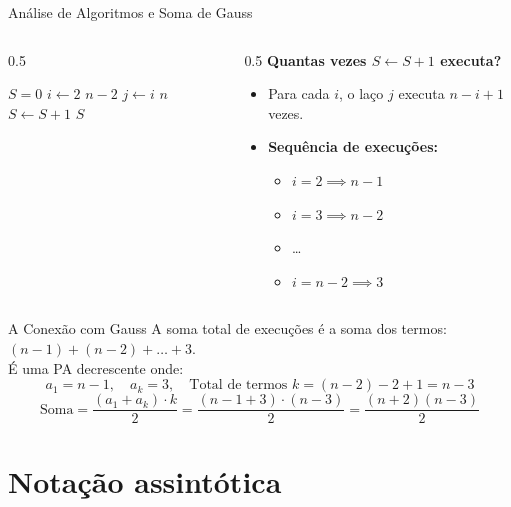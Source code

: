 \documentclass[aspectratio=169]{beamer}
\begin{document}
\begin{frame}[shrink]{Análise de Algoritmos e Soma de Gauss}
    \begin{columns}
        \begin{column}{0.5\textwidth}
            \begin{codebox}
                \li $S = 0$
                \li \For $i \gets 2$ \To $n - 2$
                \li   \Do \For $j \gets i$ \To $n$
                \li      \Do $S \gets S + 1$
                \End
                \End
                \li \Return $S$
            \end{codebox}
        \end{column}
        
        \begin{column}{0.5\textwidth}
            \textbf{Quantas vezes $S \gets S+1$ executa?}
            \begin{itemize}
                \item Para cada $i$, o laço $j$ executa $n - i + 1$ vezes.
                \item \textbf{Sequência de execuções:}
                \begin{itemize}
                    \item $i=2 \implies n-1$
                    \item $i=3 \implies n-2$
                    \item \dots
                    \item $i=n-2 \implies 3$
                \end{itemize}
            \end{itemize}
        \end{column}
    \end{columns}

    \begin{block}{A Conexão com Gauss}
        A soma total de execuções é a soma dos termos: $ (n-1) + (n-2) + \dots + 3 $. \\
        É uma PA decrescente onde:
        \[ a_1 = n-1, \quad a_k = 3, \quad \text{Total de termos } k = (n-2) - 2 + 1 = n-3 \]
        \[ \text{Soma} = \frac{(a_1 + a_k) \cdot k}{2} = \frac{(n-1 + 3) \cdot (n-3)}{2} = \frac{(n+2)(n-3)}{2} \]
    \end{block}
\end{frame}

\section{Notação assintótica} 
\end{document}
